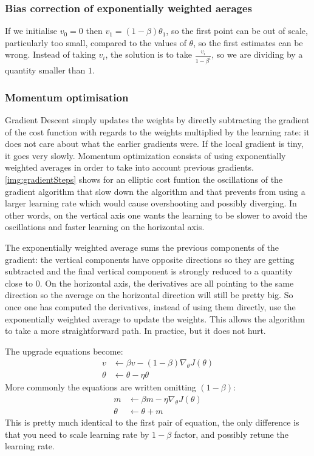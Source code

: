 \subsubsection{Bias correction of exponentially weighted aerages}
If we initialise $v_0=0$ then $v_1= (1-\beta) \theta_1$, so the first point can be out of scale, particularly too small, compared to the values of $\theta$, so the first estimates can be wrong. Instead of taking $v_i$, the solution is to take $\frac{v_i}{1-\beta^i}$, so we are dividing by a quantity smaller than $1$.

\subsubsection{Momentum optimisation}
\label{subsubsec:momentum}
Gradient Descent simply updates the weights by directly subtracting the gradient of the cost function  with regards to the weights multiplied by the learning rate: it does not care about what the earlier gradients were. If the local gradient is tiny, it goes very slowly. Momentum optimization consists of using exponentially weighted averages in order to take into account previous gradients. \autoref{img:gradientSteps} shows for an elliptic cost funtion the oscillations of the gradient algorithm that slow down the algorithm and that prevents from using a larger learning rate which would cause overshooting and possibly diverging. In other words, on the vertical axis one wants the learning to be slower to avoid the oscillations and faster learning on the horizontal axis.

The exponentially weighted average sums the previous components of the gradient: the vertical components have opposite directions so they are getting subtracted and the final vertical component is strongly reduced to a quantity close to $0$. On the horizontal axis, the derivatives are all pointing to the same direction so the average on the horizontal direction will still be pretty big. So once one has computed the derivatives, instead of using them directly, use the exponentially weighted average to update the weights. This allows the algorithm to take a more straightforward path. In practice,  but it does not hurt.

The upgrade equations become:
\begin{equation}
\begin{aligned}
v &\leftarrow \beta v - (1-\beta) \nabla_\theta J(\theta)\\
\theta &\leftarrow \theta - \eta \theta
\end{aligned}
\end{equation}
More commonly the equations are written omitting $(1-\beta)$:
\begin{equation}
\begin{aligned}
m &\leftarrow \beta m - \eta \nabla_\theta J(\theta)\\
\theta &\leftarrow \theta + m
\end{aligned}
\end{equation}
This is pretty much identical to the first pair of equation, the only difference is that you need to scale learning rate by $1-\beta$ factor, and possibly retune the learning rate.

